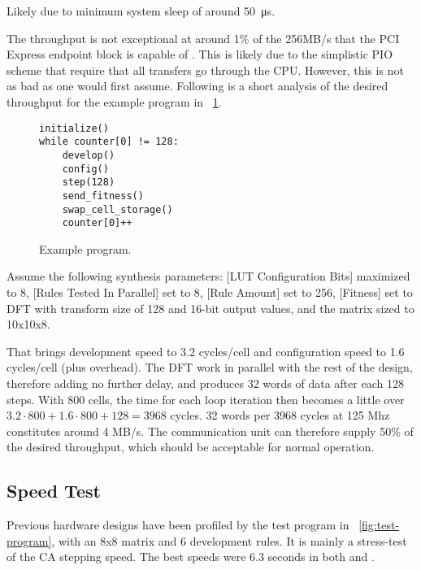 \TODO
Likely due to minimum system sleep of around \SI{50}{\micro\second}.

The throughput is not exceptional at around 1\% of the 256MB/s that the PCI Express endpoint block is capable of \cite{ug672}.
This is likely due to the simplistic PIO scheme that require that all transfers go through the CPU.
However, this is not as bad as one would first assume.
Following is a short analysis of the desired throughput for the example program in \figurename~\ref{fig:example-program}.

\begin{figure}[!ht]
\begin{lstlisting}[xleftmargin=0.35\textwidth]
initialize()
while counter[0] != 128:
    develop()
    config()
    step(128)
    send_fitness()
    swap_cell_storage()
    counter[0]++
\end{lstlisting}
\caption[Example program] {
    Example program.
}
\label{fig:example-program}
\end{figure}

Assume the following synthesis parameters:
[LUT Configuration Bits] maximized to 8,
[Rules Tested In Parallel] set to 8,
[Rule Amount] set to 256,
[Fitness] set to DFT with transform size of 128 and 16-bit output values,
and the matrix sized to 10x10x8.

That brings development speed to 3.2 cycles/cell and configuration speed to 1.6 cycles/cell (plus overhead)\footnotemark.
The DFT work in parallel with the rest of the design, therefore adding no further delay, and produces 32 words of data after each 128 steps.
With 800 cells, the time for each loop iteration then becomes a little over $3.2 \cdot 800 + 1.6 \cdot 800 + 128 = 3968$ cycles.
32 words per 3968 cycles at 125 Mhz constitutes around 4 MB/s.
The communication unit can therefore supply 50\% of the desired throughput, which should be acceptable for normal operation.


\subsection{Speed Test}

Previous hardware designs have been profiled by the test program in \figurename~\ref{fig:test-program}, with an 8x8 matrix and 6 development rules.
It is mainly a stress-test of the CA stepping speed.
The best speeds were 6.3 seconds in both \cite{djupdal2003sblock} and \cite{stovneng2014sblock}.

